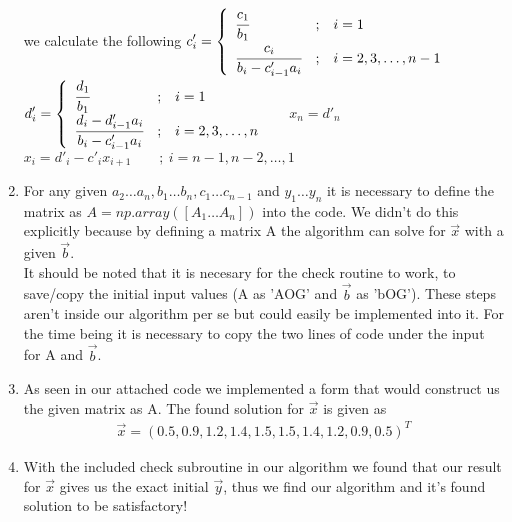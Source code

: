 \documentclass[12pt,a4paper]{article}
\begin{document}
\begin{enumerate}
		\newline
\newline we calculate the following
		\newline 
		${\displaystyle c'_{i}={\begin{cases}{\begin{array}{lcl}{\cfrac {c_{1}}{b_{1}}}&;&i=1\\{\cfrac {c_{i}}{b_{i}-c'_{i-1}a_{i}}}&;&i=2,3,\dots ,n-1\\\end{array}}\end{cases}}\,}$
		\newline 
		${\displaystyle d'_{i}={\begin{cases}{\begin{array}{lcl}{\cfrac {d_{1}}{b_{1}}}&;&i=1\\{\cfrac {d_{i}-d'_{i-1}a_{i}}{b_{i}-c'_{i-1}a_{i}}}&;&i=2,3,\dots ,n\\\end{array}}\end{cases}}\,}$
		\newline 
		$x_{n}=d'_{n}$
		\newline 
		$x_{i}=d'_{i}-c'_{i}x_{{i+1}}\qquad ;\ i=n-1,n-2,\ldots ,1$
\item For any given $a_2\dots a_n, b_1 \dots b_n, c_1 \dots c_{n-1}$ and $y_1 \dots y_n$ it is necessary to define the matrix as $A=np.array([A_1 \dots A_n])	$ into the code. We didn't do this explicitly because by defining a matrix A the algorithm can solve for $\vec{x}$ with a given $\vec{b}$.\\ It should be noted that it is necesary for the check routine to work, to save/copy the initial input values (A as 'AOG' and $\vec{b}$ as 'bOG'). These steps aren't inside our algorithm per se but could easily be implemented into it. For the time being it is necessary to copy the two lines of code under the input for A and $\vec{b}$.	
\item As seen in our attached code we implemented a form that would construct us the given matrix as A. The found solution for $\vec{x}$ is given as 
\begin{align*}
\vec{x}=\left(0.5, 0.9, 1.2, 1.4, 1.5, 1.5, 1.4, 1.2, 0.9, 0.5\right)^T
\end{align*}
\item With the included check subroutine in our algorithm we found that our result for 	$\vec{x}$ gives us the exact initial $\vec{y}$, thus we find our algorithm and it's found solution to be satisfactory!	
\end{enumerate}
\end{document}

